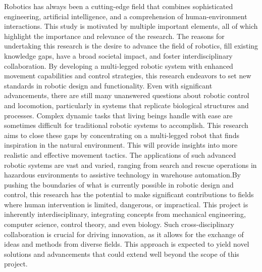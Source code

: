 Robotics has always been a cutting-edge field that combines sophisticated engineering, artificial intelligence, and a comprehension of human-environment interactions.
This study is motivated by multiple important elements, all of which highlight the importance and relevance of the research.
The reasons for undertaking this research is the desire to advance the field of robotics, fill existing knowledge gaps, have a broad societal impact, and foster interdisciplinary collaboration.
By developing a multi-legged robotic system with enhanced movement capabilities and control strategies, this research endeavors to set new standards in robotic design and functionality. Even with significant advancements, there are still many unanswered questions about robotic control and locomotion, particularly in systems that replicate biological structures and processes. Complex dynamic tasks that living beings handle with ease are sometimes difficult for traditional robotic systems to accomplish. This research aims to close these gaps by concentrating on a multi-legged robot that finds inspiration in the natural environment. This will provide insights into more realistic and effective movement tactics. The applications of such advanced robotic systems are vast and varied, ranging from search and rescue operations in hazardous environments to assistive technology in warehouse automation.By pushing the boundaries of what is currently possible in robotic design and control, this research has the potential to make significant contributions to fields where human intervention is limited, dangerous, or impractical. This project is inherently interdisciplinary, integrating concepts from mechanical engineering, computer science, control theory, and even biology. Such cross-disciplinary collaboration is crucial for driving innovation, as it allows for the exchange of ideas and methods from diverse fields. This approach is expected to yield novel solutions and advancements that could extend well beyond the scope of this project.


